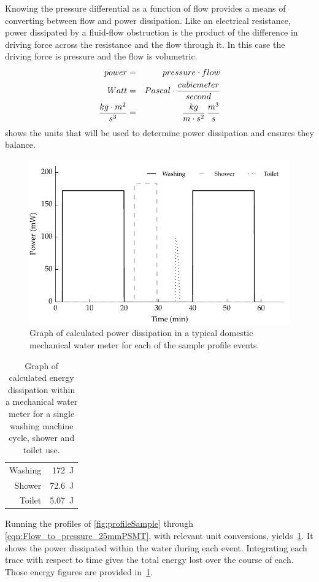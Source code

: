     Knowing the pressure differential as a function of flow provides a means of converting between flow and power dissipation.
    Like an electrical resistance, power dissipated by a fluid-flow obstruction is the product of the difference in driving force across the resistance and the flow through it.
    In this case the driving force is pressure and the flow is volumetric.
    \begin{eqnarray}
        power &=& pressure \cdot flow\nonumber \\
        Watt &=& Pascal \cdot \frac{cubic meter}{second}\nonumber \\
        \frac{kg\cdot m^{2}}{s^{3}} &=& \frac{kg}{m\cdot  s^{2}} \thinspace \frac{m^{3}}{s}\\
        \label{eqn:pressure_flow_to_power}
    \end{eqnarray}
     shows the units that will be used to determine power dissipation and ensures they balance.
    \begin{figure}
        \centering
        \includegraphics[width=\linewidth]{content/pt1/02-WirelessWaterMeter/graphics/graph_harvest}
        \caption{Graph of calculated power dissipation in a typical domestic mechanical water meter for each of the sample profile events.}
        \label{fig:powerDissipated_meter}
    \end{figure}
    \begin{table}
      \centering
      \begin{tabular}{r|r}
          Washing & \SI{172}{\joule}\\
          Shower  & \SI{72.6}{\joule}\\
          Toilet  & \SI{5.07}{\joule}
      \end{tabular}
      \caption{
        \label{tab:energy_dissipation_figures}
        Graph of calculated energy dissipation within a mechanical water meter for a single washing machine cycle, shower and toilet use.
      }
    \end{table}
    Running the profiles of \cref{fig:profileSample} through \cref{eqn:Flow_to_pressure_25mmPSMT}, with relevant unit conversions, yields~\cref{fig:powerDissipated_meter}.
    It shows the power dissipated within the water during each event.
    Integrating each trace with respect to time gives the total energy lost over the course of each.
    Those energy figures are provided in~\cref{tab:energy_dissipation_figures}.

